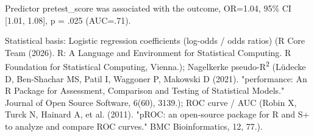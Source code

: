 \documentclass{article}
\begin{document}
Predictor pretest\_score was associated with the outcome, OR=1.04, 95\% CI [1.01, 1.08], p = .025 (AUC=.71).

Statistical basis: Logistic regression coefficients (log-odds / odds ratios) (R Core Team (2026). R: A Language and Environment for Statistical Computing. R Foundation for Statistical Computing, Vienna.); Nagelkerke pseudo-R\textsuperscript{2} (Lüdecke D, Ben-Shachar MS, Patil I, Waggoner P, Makowski D (2021). "performance: An R Package for Assessment, Comparison and Testing of Statistical Models." Journal of Open Source Software, 6(60), 3139.); ROC curve / AUC (Robin X, Turck N, Hainard A, et al. (2011). "pROC: an open-source package for R and S+ to analyze and compare ROC curves." BMC Bioinformatics, 12, 77.).
\end{document}
